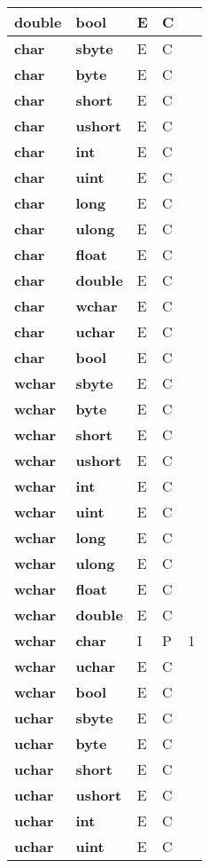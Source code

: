 \documentclass[a4paper,oneside,11pt]{book}
\theoremstyle{definition}
\begin{document}
\begin{flushleft}
\begin{supertabular}{lllll}
\textbf{double}& \textbf{bool}& E& C&\\
\hline
\textbf{char}& \textbf{sbyte}& E& C&\\
\textbf{char}& \textbf{byte}& E& C&\\
\textbf{char}& \textbf{short}& E& C&\\
\textbf{char}& \textbf{ushort}& E& C&\\
\textbf{char}& \textbf{int}& E& C&\\
\textbf{char}& \textbf{uint}& E& C&\\
\textbf{char}& \textbf{long}& E& C&\\
\textbf{char}& \textbf{ulong}& E& C&\\
\textbf{char}& \textbf{float}& E& C&\\
\textbf{char}& \textbf{double}& E& C&\\
\textbf{char}& \textbf{wchar}& E& C&\\
\textbf{char}& \textbf{uchar}& E& C&\\
\textbf{char}& \textbf{bool}& E& C&\\
\hline
\textbf{wchar}& \textbf{sbyte}& E& C&\\
\textbf{wchar}& \textbf{byte}& E& C&\\
\textbf{wchar}& \textbf{short}& E& C&\\
\textbf{wchar}& \textbf{ushort}& E& C&\\
\textbf{wchar}& \textbf{int}& E& C&\\
\textbf{wchar}& \textbf{uint}& E& C&\\
\textbf{wchar}& \textbf{long}& E& C&\\
\textbf{wchar}& \textbf{ulong}& E& C&\\
\textbf{wchar}& \textbf{float}& E& C&\\
\textbf{wchar}& \textbf{double}& E& C&\\
\textbf{wchar}& \textbf{char}& I& P&1\\
\textbf{wchar}& \textbf{uchar}& E& C&\\
\textbf{wchar}& \textbf{bool}& E& C&\\
\hline
\textbf{uchar}& \textbf{sbyte}& E& C&\\
\textbf{uchar}& \textbf{byte}& E& C&\\
\textbf{uchar}& \textbf{short}& E& C&\\
\textbf{uchar}& \textbf{ushort}& E& C&\\
\textbf{uchar}& \textbf{int}& E& C&\\
\textbf{uchar}& \textbf{uint}& E& C&\\

\end{supertabular}
\end{flushleft}
\end{document}
